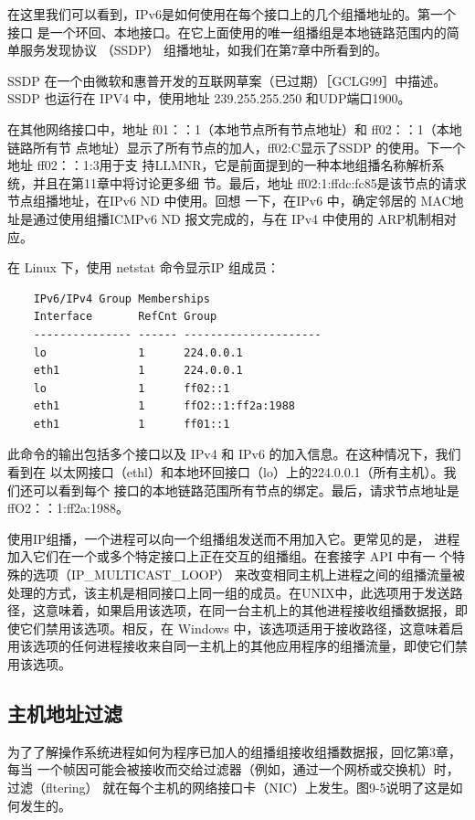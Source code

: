 在这里我们可以看到，IPv6是如何使用在每个接口上的几个组播地址的。第一个接口
是一个环回、本地接口。在它上面使用的唯一组播组是本地链路范围内的简单服务发现协议
（SSDP） 组播地址，如我们在第7章中所看到的。

\begin{tcolorbox}
    SSDP 在一个由微软和惠普开发的互联网草案（已过期）［GCLG99］中描述。
    SSDP 也运行在 IPV4 中，使用地址 239.255.255.250 和UDP端口1900。
\end{tcolorbox}

在其他网络接口中，地址 f01：：1（本地节点所有节点地址）和 ff02：：1（本地链路所有节
点地址）显示了所有节点的加人，ff02:C显示了SSDP 的使用。下一个地址 ff02：：1:3用于支
持LLMNR，它是前面提到的一种本地组播名称解析系统，并且在第11章中将讨论更多细
节。最后，地址 ff02:1:ffdc:fc85是该节点的请求节点组播地址，在IPv6 ND 中使用。回想
一下，在IPv6 中，确定邻居的 MAC地址是通过使用组播ICMPv6 ND 报文完成的，与在
IPv4 中使用的 ARP机制相对应。

在 Linux 下，使用 netstat 命令显示IP 组成员：

\begin{verbatim}
    IPv6/IPv4 Group Memberships
    Interface       RefCnt Group
    --------------- ------ ---------------------
    lo              1      224.0.0.1
    eth1            1      224.0.0.1
    lo              1      ff02::1
    eth1            1      ffO2::1:ff2a:1988
    eth1            1      ff01::1
\end{verbatim}

此命令的输出包括多个接口以及 IPv4 和 IPv6 的加入信息。在这种情况下，我们看到在
以太网接口（ethl）和本地环回接口（lo）上的224.0.0.1（所有主机）。我们还可以看到每个
接口的本地链路范围所有节点的绑定。最后，请求节点地址是 ffO2：：1:ff2a:1988。

\begin{tcolorbox}
    使用IP组播，一个进程可以向一个组播组发送而不用加入它。更常见的是，
    进程加入它们在一个或多个特定接口上正在交互的组播组。在套接字 API 中有一
    个特殊的选项（IP\_MULTICAST\_LOOP） 来改变相同主机上进程之间的组播流量被
    处理的方式，该主机是相同接口上同一组的成员。在UNIX中，此选项用于发送路
    径，这意味着，如果启用该选项，在同一台主机上的其他进程接收组播数据报，即
    使它们禁用该选项。相反，在 Windows 中，该选项适用于接收路径，这意味着启
    用该选项的任何进程接收来自同一主机上的其他应用程序的组播流量，即使它们禁
    用该选项。
\end{tcolorbox}

\subsection{主机地址过滤}
为了了解操作系统进程如何为程序已加人的组播组接收组播数据报，回忆第3章，每当
一个帧因可能会被接收而交给过滤器（例如，通过一个网桥或交换机）时，过滤（fltering）
就在每个主机的网络接口卡（NIC）上发生。图9-5说明了这是如何发生的。

